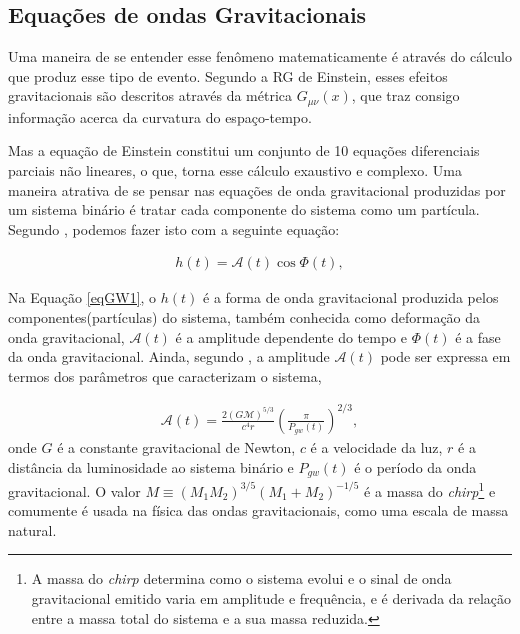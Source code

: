 \subsection{Equações de ondas Gravitacionais}

Uma maneira de se entender esse fenômeno matematicamente é através do cálculo que produz esse tipo de evento. Segundo a RG de Einstein, esses efeitos gravitacionais são descritos através da métrica $G_{\mu \nu}(x)$, que traz consigo informação acerca da curvatura do espaço-tempo.

Mas a equação de Einstein constitui um conjunto de 10 equações diferenciais parciais não lineares, o que, torna esse cálculo exaustivo e complexo. Uma maneira atrativa de se pensar nas equações de onda gravitacional produzidas por um sistema binário é tratar cada componente do sistema como um partícula. Segundo \cite{rubbo2007hands}, podemos fazer isto com a seguinte equação:

\begin{equation} \label{eqGW1}
\begin{split}
h(t) = \mathcal{A}(t)\cos \Phi(t),
\end{split}
\end{equation}

Na Equação \ref{eqGW1}, o $h(t)$ é a forma de onda gravitacional produzida pelos componentes(partículas) do sistema, também conhecida como deformação da onda gravitacional, $\mathcal{A}(t)$ é a amplitude dependente do tempo e $\Phi (t)$ é a fase da onda gravitacional. Ainda, segundo \cite{rubbo2007hands}, a amplitude $\mathcal{A}(t)$ pode ser expressa em termos dos parâmetros que caracterizam o sistema,

\begin{equation} \label{eqGW2}
\begin{split}
\mathcal{A}(t) = \frac{2(G\mathcal{M})^{5/3}}{c^4 r} \left(\frac{\pi}{P_{gw}(t)}\right)^{2/3} ,
\end{split}
\end{equation}
onde $G$ é a constante gravitacional de Newton, $c$ é a velocidade da luz, $r$ é a distância da luminosidade ao sistema binário e $P_{gw}(t)$ é o período da onda gravitacional. O valor $M \equiv (M_1 M_2)^{3/5}(M_1+M_2)^{-1/5}$ é a massa do \textit{chirp}\footnote{A massa do \textit{chirp} determina como o sistema evolui e o sinal de onda gravitacional emitido varia em amplitude e frequência, e é derivada da relação entre a massa total do sistema e a sua massa reduzida.} e comumente é usada na física das ondas gravitacionais, como uma escala de massa natural.

